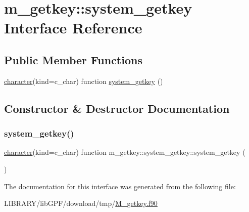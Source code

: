 \hypertarget{interfacem__getkey_1_1system__getkey}{}\section{m\+\_\+getkey\+:\+:system\+\_\+getkey Interface Reference}
\label{interfacem__getkey_1_1system__getkey}
\subsection*{Public Member Functions}
\begin{DoxyCompactItemize}
\item 
\hyperlink{option__stopwatch_83_8txt_abd4b21fbbd175834027b5224bfe97e66}{character}(kind=c\+\_\+char) function \hyperlink{interfacem__getkey_1_1system__getkey_af05852abd6778b768cfe2f2838dc748f}{system\+\_\+getkey} ()
\end{DoxyCompactItemize}


\subsection{Constructor \& Destructor Documentation}
\mbox{\label{interfacem__getkey_1_1system__getkey_af05852abd6778b768cfe2f2838dc748f}} 
\subsubsection{\texorpdfstring{system\+\_\+getkey()}{system\_getkey()}}
{\footnotesize\ttfamily \hyperlink{option__stopwatch_83_8txt_abd4b21fbbd175834027b5224bfe97e66}{character}(kind=c\+\_\+char) function m\+\_\+getkey\+::system\+\_\+getkey\+::system\+\_\+getkey (\begin{DoxyParamCaption}{ }\end{DoxyParamCaption})}



The documentation for this interface was generated from the following file\+:\begin{DoxyCompactItemize}
\item 
L\+I\+B\+R\+A\+R\+Y/lib\+G\+P\+F/download/tmp/\hyperlink{M__getkey_8f90}{M\+\_\+getkey.\+f90}\end{DoxyCompactItemize}

